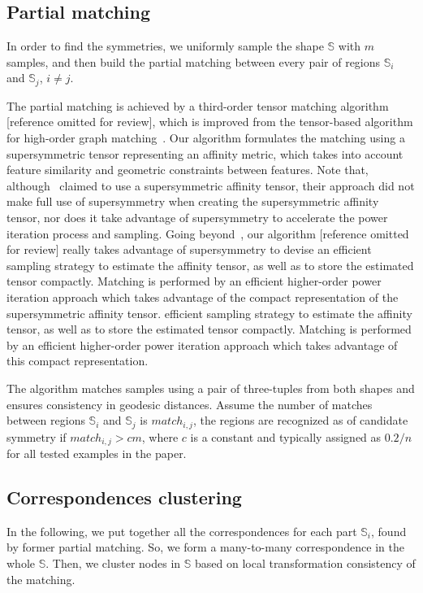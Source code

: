 \subsection{Partial matching}
\label{subsec:matching}

In order to find the symmetries, we uniformly sample the shape $\mathbb{S}$ with $m$ samples, 
and then build the partial matching between every pair of regions $\mathbb{S}_i$ and $\mathbb{S}_j$, $i \neq j$. 

The partial matching is achieved by a third-order tensor matching algorithm [reference omitted for review],
which is improved from the tensor-based algorithm for high-order graph matching~\cite{Duchenne2011}.
Our algorithm formulates the matching using a supersymmetric tensor representing an affinity metric,
which takes into account feature similarity and geometric constraints between features.
Note that, although~\cite{Duchenne2011} claimed to use a supersymmetric affinity tensor, 
their approach did not make full use of supersymmetry when creating the supersymmetric affinity tensor, nor does it take advantage of supersymmetry
to accelerate the power iteration process and sampling.
Going beyond~\cite{Duchenne2011}, our algorithm [reference omitted for review] really takes advantage of supersymmetry to devise an
efficient sampling strategy to estimate the affinity tensor, as well as to store the estimated tensor compactly.
Matching is performed by an efficient higher-order power iteration approach which takes advantage of the compact representation of the supersymmetric affinity tensor.
efficient sampling strategy to estimate the affinity tensor, as well as to store the estimated tensor compactly.
Matching is performed by an efficient higher-order power iteration approach which takes advantage of this compact representation.

The algorithm matches samples using a pair of three-tuples from both shapes and ensures consistency in geodesic distances. 
Assume the number of matches between regions $\mathbb{S}_i$ and $\mathbb{S}_j$ is $match_{i,j}$, 
the regions are recognized as of candidate symmetry if $match_{i,j} > cm$, where $c$ is a constant and typically assigned as $0.2/n$ for all tested examples in the paper.

\subsection{Correspondences clustering}

In the following, we put together all the correspondences for each part $\mathbb{S}_i$, found by former partial matching.
So, we form a many-to-many correspondence in the whole $\mathbb{S}$.  
Then, we cluster nodes in $\mathbb{S}$ based on local transformation consistency of the matching.


